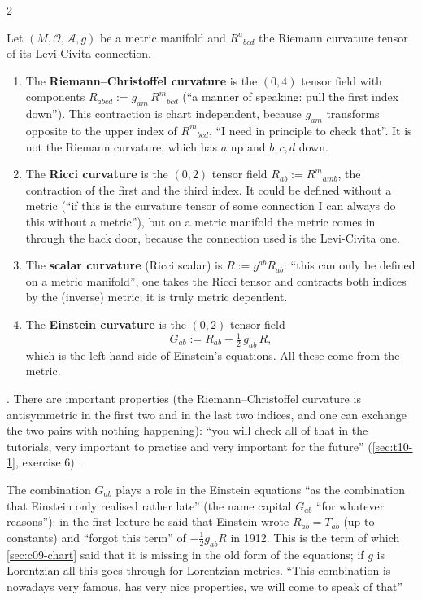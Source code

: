 \begin{paracol}{2}
\begin{definition}\label{def:c10-curv}
Let $(M,\mathcal O,\mathcal A,g)$ be a metric manifold and $R^a{}_{bcd}$ the Riemann curvature tensor of its Levi-Civita connection.
\begin{enumerate}
  \item The \textbf{Riemann--Christoffel curvature} is the $(0,4)$ tensor field with components $R_{abcd}:=g_{am}\,R^m{}_{bcd}$ (``a manner of speaking: pull the first index down''). This contraction is chart independent, because $g_{am}$ transforms opposite to the upper index of $R^m{}_{bcd}$, ``I need in principle to check that''. It is not the Riemann curvature, which has $a$ up and $b,c,d$ down.
  \item The \textbf{Ricci curvature} is the $(0,2)$ tensor field $R_{ab}:=R^m{}_{amb}$, the contraction of the first and the third index. It could be defined without a metric (``if this is the curvature tensor of some connection I can always do this without a metric''), but on a metric manifold the metric comes in through the back door, because the connection used is the Levi-Civita one.
  \item The \textbf{scalar curvature} (Ricci scalar) is $R:=g^{ab}R_{ab}$: ``this can only be defined on a metric manifold'', one takes the Ricci tensor and contracts both indices by the (inverse) metric; it is truly metric dependent.
  \item The \textbf{Einstein curvature} is the $(0,2)$ tensor field
        \[
          G_{ab}:=R_{ab}-\tfrac12\,g_{ab}\,R,
        \]
        which is the left-hand side of Einstein's equations. All these come from the metric.
\end{enumerate}
\end{definition}
.
There are important properties (the Riemann--Christoffel curvature is antisymmetric in the first two and in the last two indices, and one can exchange the two pairs with nothing happening): ``you will check all of that in the tutorials, very important to practise and very important for the future'' (\cref{sec:t10-1}, exercise 6) .
\begin{aside}
The combination $G_{ab}$ plays a role in the Einstein equations ``as the combination that Einstein only realised rather late'' (the name capital $G_{ab}$ ``for whatever reasons''): in the first lecture he said that Einstein wrote $R_{ab}=T_{ab}$ (up to constants) and ``forgot this term'' of $-\tfrac12g_{ab}R$ in 1912. This is the term of which \cref{sec:c09-chart} said that it is missing in the old form of the equations; if $g$ is Lorentzian all this goes through for Lorentzian metrics. ``This combination is nowadays very famous, has very nice properties, we will come to speak of that''

\end{aside}
\end{paracol}
